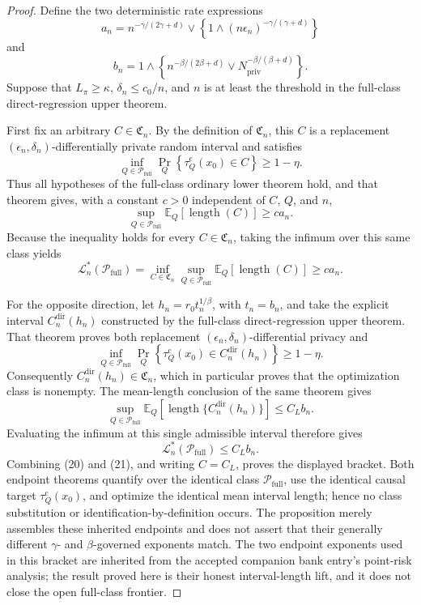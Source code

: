 \documentclass{article}
\begin{document}
\begin{proof}
Define the two deterministic rate expressions
\[
 a_n=
 n^{-\gamma/(2\gamma+d)}
 \vee\left\{1\wedge(n\epsilon_n)^{-\gamma/(\gamma+d)}\right\}
\]
and
\[
 b_n=
 1\wedge\left\{
 n^{-\beta/(2\beta+d)}
 \vee N_{\mathrm{priv}}^{-\beta/(\beta+d)}
 \right\}.
\]
Suppose that \(L_\pi\ge\kappa\), \(\delta_n\le c_0/n\), and \(n\) is at least the threshold in the full-class direct-regression upper theorem.

First fix an arbitrary \(C\in\mathfrak C_n\).  By the definition of \(\mathfrak C_n\), this \(C\) is a replacement \((\epsilon_n,\delta_n)\)-differentially private random interval and satisfies
\[
 \inf_{Q\in\mathcal P_{\mathrm{full}}}
 \Pr_Q\!\left\{\tau_Q^{\mathrm c}(x_0)\in C\right\}
 \ge 1-\eta.
\]
Thus all hypotheses of the full-class ordinary lower theorem hold, and that theorem gives, with a constant \(c>0\) independent of \(C\), \(Q\), and \(n\),
\[
 \sup_{Q\in\mathcal P_{\mathrm{full}}}
 \mathbb E_Q[\operatorname{length}(C)]
 \ge c a_n.
\]
Because the inequality holds for every \(C\in\mathfrak C_n\), taking the infimum over this same class yields
\[
 \mathcal L_n^*(\mathcal P_{\mathrm{full}})
 =\inf_{C\in\mathfrak C_n}
   \sup_{Q\in\mathcal P_{\mathrm{full}}}
   \mathbb E_Q[\operatorname{length}(C)]
 \ge c a_n.
\tag{20}
\]

For the opposite direction, let \(h_n=r_0t_n^{1/\beta}\), with \(t_n=b_n\), and take the explicit interval \(C_n^{\mathrm{dir}}(h_n)\) constructed by the full-class direct-regression upper theorem.  That theorem proves both replacement \((\epsilon_n,\delta_n)\)-differential privacy and
\[
 \inf_{Q\in\mathcal P_{\mathrm{full}}}
 \Pr_Q\!\left\{\tau_Q^{\mathrm c}(x_0)
       \in C_n^{\mathrm{dir}}(h_n)\right\}
 \ge 1-\eta.
\]
Consequently \(C_n^{\mathrm{dir}}(h_n)\in\mathfrak C_n\), which in particular proves that the optimization class is nonempty.  The mean-length conclusion of the same theorem gives
\[
 \sup_{Q\in\mathcal P_{\mathrm{full}}}
 \mathbb E_Q\!\left[
   \operatorname{length}\{C_n^{\mathrm{dir}}(h_n)\}
 \right]
 \le C_L b_n.
\]
Evaluating the infimum at this single admissible interval therefore gives
\[
 \mathcal L_n^*(\mathcal P_{\mathrm{full}})
 \le C_L b_n.
\tag{21}
\]
Combining (20) and (21), and writing \(C=C_L\), proves the displayed bracket.  Both endpoint theorems quantify over the identical class \(\mathcal P_{\mathrm{full}}\), use the identical causal target \(\tau_Q^{\mathrm c}(x_0)\), and optimize the identical mean interval length; hence no class substitution or identification-by-definition occurs.  The proposition merely assembles these inherited endpoints and does not assert that their generally different \(\gamma\)- and \(\beta\)-governed exponents match.  The two endpoint exponents used in this bracket are inherited from the accepted companion bank entry's point-risk analysis; the result proved here is their honest interval-length lift, and it does not close the open full-class frontier.
\end{proof}
\end{document}
